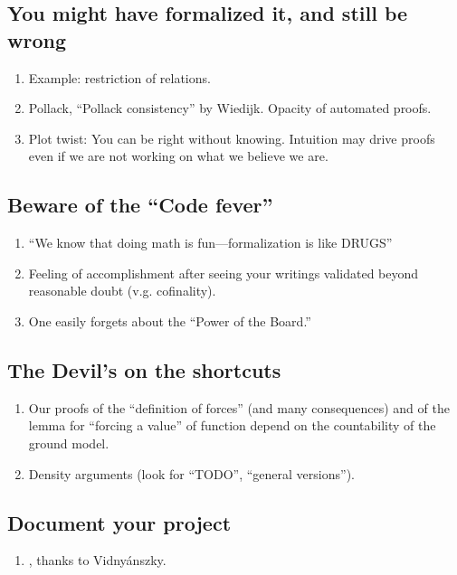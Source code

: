 \subsection{You might have formalized it, and still be wrong}
\begin{enumerate}
\item Example: restriction of relations.
\item Pollack, “Pollack consistency” by Wiedijk. Opacity of automated
  proofs.
\item Plot twist: You can be right without knowing. Intuition may drive proofs
  even if we are not working on what we believe we are.
\end{enumerate}

\subsection{Beware of the “Code fever”}\label{sec:beware-code-fever}
\begin{enumerate}
\item “We know that doing math is fun---formalization is like DRUGS”
\item Feeling of accomplishment after seeing your writings
  validated beyond reasonable doubt (v.g. cofinality).

\item One easily forgets about the “Power of the Board.”
\end{enumerate}

\subsection{The Devil's on the shortcuts}
\begin{enumerate}
\item
  Our proofs of the “definition of forces” (and many
  consequences) and of the lemma for “forcing a value” of function
  depend on the countability of the ground model. 
\item
  Density arguments (look for “TODO”, “general versions”).
\end{enumerate}

\subsection{Document your project}
\begin{enumerate}
\item {}, thanks to Vidnyánszky.
\end{enumerate}

